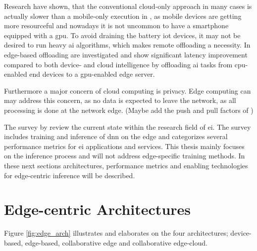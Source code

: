 Research have shown, that the conventional cloud-only approach in many cases is actually slower than a mobile-only execution in \cite{kang_neurosurgeon:_2017}, as mobile devices are getting more resourceful and nowadays it is not uncommon to have a smartphone equipped with a \gls{gpu}. To avoid draining the battery \gls{iot} devices, it may not be desired to run heavy \gls{ai} algorithms, which makes remote offloading a necessity.  In \cite{karlsen_prototyping_nodate} edge-based offloading are investigated and show significant latency improvement compared to both device- and cloud intelligence by offloading \gls{ai} tasks from \gls{cpu}-enabled end devices to a \gls{gpu}-enabled edge server. 

Furthermore a major concern of cloud computing is privacy. Edge computing can may address this concern, as no data is expected to leave the network, as all processing is done at the network edge. (Maybe add the push and pull factors of \cite{zhou_edge_2019}) 
 
The survey  by \citet{zhou_edge_2019} review the current state within the research field of \gls{ei}. The survey includes training and inference of \gls{dnn} on the edge and categorizes several performance metrics for \gls{ei} applications and services. This thesis mainly focuses on the inference process and will not address edge-specific training methods. In these next sections architectures, performance metrics and enabling technologies for edge-centric inference will be described.

\newpage
\section{Edge-centric Architectures}

Figure \ref{fig:edge_arch} illustrates and elaborates on the four architectures; \protect{} device-based, \protect{} edge-based, \protect{} collaborative edge and \protect{} collaborative edge-cloud. 

